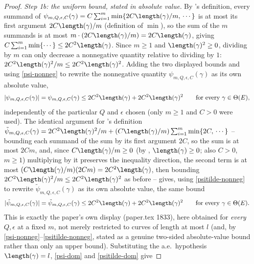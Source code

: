 \begin{proof}
  \emph{Step 1b: the uniform bound, stated in absolute value.} By
  's definition, every summand of
  $\psi_{m,Q,\epsilon,C}(\gamma) = C\sum_{i=1}^m \min\{2C\length(\gamma)/m,\,\cdots\}$ is at most its
  first argument $2C\length(\gamma)/m$ (definition of $\min$), so the sum of the $m$ summands is at
  most $m\cdot(2C\length(\gamma)/m) = 2C\length(\gamma)$, giving
  $C\sum_{i=1}^m\min\{\cdots\} \le 2C^2\length(\gamma)$. Since $m\ge1$ and $\length(\gamma)^2\ge0$,
  dividing by $m$ can only decrease a nonnegative quantity relative to dividing by $1$:
  $2C^2\length(\gamma)^2/m \le 2C^2\length(\gamma)^2$. Adding the two displayed bounds and using
  \eqref{psi-nonneg} to rewrite the nonnegative quantity $\psi_{m,Q,\epsilon,C}(\gamma)$ as its own
  absolute value,
  \begin{equation}\label{psi-dom}
    |\psi_{m,Q,\epsilon,C}(\gamma)| = \psi_{m,Q,\epsilon,C}(\gamma) \le 2C^2\length(\gamma) + 2C^2\length(\gamma)^2
    \qquad\text{for every } \gamma \in \Theta(E)
    ,
  \end{equation}
  independently of the particular $Q$ and $\epsilon$ chosen (only $m\ge1$ and $C>0$ were used).
  The identical argument for 's definition
  $\tilde\psi_{m,Q,\epsilon,C}(\gamma) = 2C^2\length(\gamma)^2/m +
  (C\length(\gamma)/m)\sum_{i=1}^m\min\{2C,\,\cdots\}$ -- bounding each summand of the sum by its
  first argument $2C$, so the sum is at most $2Cm$, and, since $C\length(\gamma)/m\ge0$ (by
  , $\length(\gamma)\ge0$; also $C>0$, $m\ge1$) multiplying by it preserves the
  inequality direction, the second term is at most
  $(C\length(\gamma)/m)(2Cm) = 2C^2\length(\gamma)$, then bounding
  $2C^2\length(\gamma)^2/m\le2C^2\length(\gamma)^2$ as before -- gives, using \eqref{psitilde-nonneg}
  to rewrite $\tilde\psi_{m,Q,\epsilon,C}(\gamma)$ as its own absolute value, the same bound
  \begin{equation}\label{psitilde-dom}
    |\tilde\psi_{m,Q,\epsilon,C}(\gamma)| = \tilde\psi_{m,Q,\epsilon,C}(\gamma) \le 2C^2\length(\gamma) + 2C^2\length(\gamma)^2
    \qquad\text{for every } \gamma\in\Theta(E)
    .
  \end{equation}
  This is exactly the paper's own display (paper.tex 1833), here obtained for \emph{every} $Q,
  \epsilon$ at a fixed $m$, not merely restricted to curves of length at most $l$ (and, by
  \eqref{psi-nonneg}--\eqref{psitilde-nonneg}, stated as a genuine two-sided absolute-value bound
  rather than only an upper bound). Substituting the
  a.e.\ hypothesis $\length(\gamma)=l$, \eqref{psi-dom} and \eqref{psitilde-dom} give

\end{proof}

